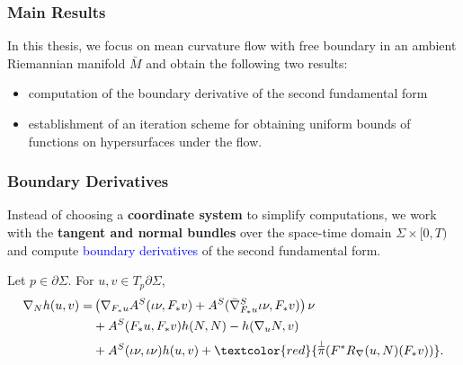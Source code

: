 \documentclass[pdf]{beamer}
\begin{document}
    \begin{frame}
        \frametitle{Main Results}
        In this thesis, we focus on mean curvature flow with free boundary in an ambient Riemannian manifold $\bar{M}$ and obtain the following two results:
        \vspace{0.4cm}
        \begin{itemize}
            \justifying
            \item computation of the boundary derivative of the second fundamental form
             \vspace{0.2cm}
            \item establishment of an iteration scheme for obtaining uniform bounds of functions on hypersurfaces under the flow.
        \end{itemize}
    \end{frame}

    \begin{frame}
        \frametitle{Boundary Derivatives}
        Instead of choosing a \textbf{coordinate system} to simplify computations, we work with the \textbf{tangent and normal bundles} over the space-time domain $\Sigma \times [0,T)$ and compute \textcolor{blue}{boundary derivatives} of the second fundamental form.
        \begin{theorem}
            Let $p \in \partial \Sigma$. For $u,v \in T_p \partial \Sigma $, 
    \begin{equation*}
        \begin{split}
            \nabla _N h(u,v)
            =& \left( \nabla _{F_*u}A^S(\iota \nu , F_*v)+A^S(\bar{\nabla }^{S}_{F_*u} \iota \nu , F_*v)  \right)   \nu \\
            & +A^S(F_*u, F_* v)h(N,N)-h(\nabla_u N, v) \\
            & + A^S(\iota  \nu  , \iota \nu )h(u,v) +\textcolor{red}{\overset{\perp }{\pi} (F^*R_{\nabla }(u,N)(F_* v))}.
    \end{split}
    \end{equation*}
        \end{theorem}
    \end{frame}
\end{document}
